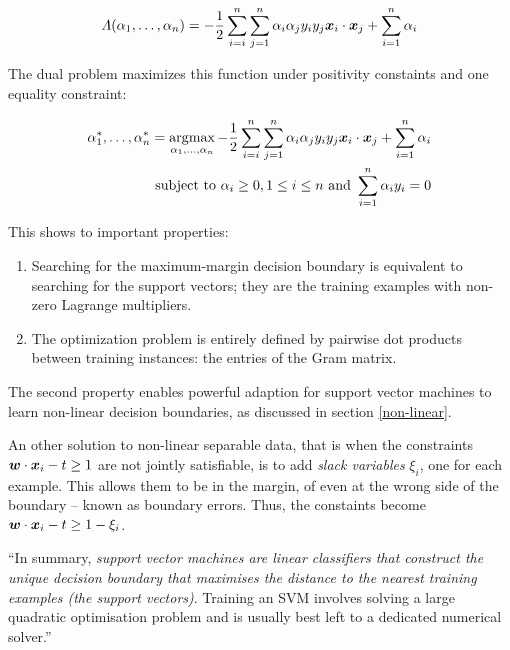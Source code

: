 \begin{equation}
  \Lambda(\alpha_1, \dots, \alpha_n) = - \frac{1}{2} \sum\limits_{i=i}^n \sum\limits_{j=1}^n \alpha_i \alpha_j y_i y_j \vectorsym{x}_i \cdot \vectorsym{x}_j + \sum\limits_{i=1}^n \alpha_i
\end{equation}

The dual problem maximizes this function under positivity constaints and one equality constraint:

\begin{equation}
\begin{aligned}
  \alpha_1^*, \dots, \alpha_n^* = \argmax\limits_{\alpha_1, \dots, \alpha_n} - \frac{1}{2} \sum\limits_{i=i}^n \sum\limits_{j=1}^n \alpha_i \alpha_j y_i y_j \vectorsym{x}_i \cdot \vectorsym{x}_j + \sum\limits_{i=1}^n \alpha_i \\
  \text{subject to } \alpha_i \geq 0, 1 \leq i \leq n \text{ and } \sum\limits_{i=1}^n \alpha_i y_i = 0
\end{aligned}
\end{equation}

This shows to important properties:
\begin{enumerate}
  \item Searching for the maximum-margin decision boundary is equivalent to searching for the support vectors; they are the training examples with non-zero Lagrange multipliers.
  \item The optimization problem is entirely defined by pairwise dot products between training instances: the entries of the Gram matrix.
\end{enumerate}

The second property enables powerful adaption for support vector machines to learn non-linear decision boundaries, as discussed in section \ref{non-linear}.

An other solution to non-linear separable data, that is when the constraints $\vectorsym{w} \cdot \vectorsym{x}_i - t \geq 1$ are not jointly satisfiable, is to add \emph{slack variables} $\xi_i$, one for each example.
This allows them to be in the margin, of even at the wrong side of the boundary -- known as boundary errors.
Thus, the constaints become $\vectorsym{w} \cdot \vectorsym{x}_i - t \geq 1 - \xi_i$.

``In summary, \emph{support vector machines are linear classifiers that construct the unique decision boundary that maximises the distance to the nearest training examples (the support vectors)}.
Training an SVM involves solving a large quadratic optimisation problem and is usually best left to a dedicated numerical solver.''

